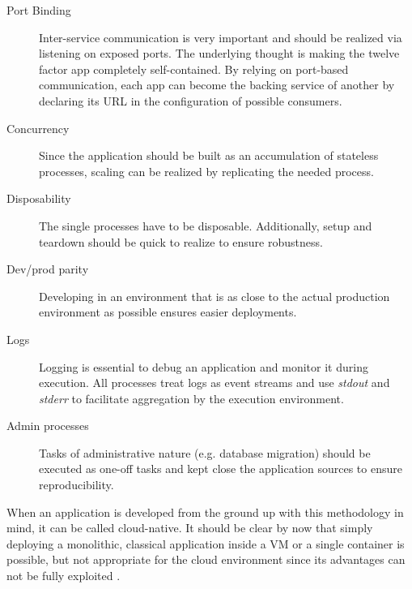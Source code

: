 \begin{description}
	\item[Port Binding] Inter-service communication is very important and should be realized via listening on exposed ports. The underlying thought is making the twelve factor app completely self-contained. By relying on port-based communication, each app can become the backing service of another by declaring its URL in the configuration of possible consumers. 
	\item[Concurrency] Since the application should be built as an accumulation of stateless processes, scaling can be realized by replicating the needed process.
	\item[Disposability] The single processes have to be disposable. Additionally, setup and teardown should be quick to realize to ensure robustness. 
	\item[Dev/prod parity] Developing in an environment that is as close to the actual production environment as possible ensures easier deployments.
	\item[Logs] Logging is essential to debug an application and monitor it during execution. All processes treat logs as event streams and use \textit{stdout} and \textit{stderr} to facilitate aggregation by the execution environment. 
	\item[Admin processes] Tasks of administrative nature (e.g. database migration) should be executed as one-off tasks and kept close the application sources to ensure reproducibility.
\end{description}

When an application is developed from the ground up with this methodology in mind, it can be called cloud-native. It should be clear by now that simply deploying a monolithic, classical application inside a VM or a single container is possible, but not appropriate for the cloud environment since its advantages can not be fully exploited \cite{hofmann2017microservices} \cite{12Factor}.

